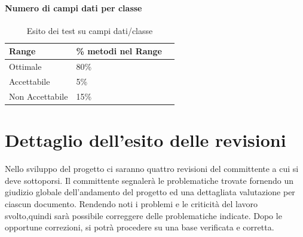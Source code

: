 \documentclass[12pt,a4paper]{article}
\begin{document}
\paragraph{Numero di campi dati per classe}
\begin{table}[H]
	\begin{center}
		\begin{tabular}{p{} p{} p{}}
			\toprule
			\textbf{Range}   & \textbf{\% metodi nel Range}	 \\ \midrule
			\midrule
			
			Ottimale & 80\% \\ \midrule
			Accettabile & 5\%  \\ \midrule
			Non Accettabile  & 15\%  \\ \midrule
			\bottomrule
		\end{tabular}
	\end{center}
	\caption{Esito dei test su campi dati/classe}
\end{table}


\section{Dettaglio dell'esito delle revisioni}
Nello sviluppo del progetto ci saranno quattro revisioni del committente a cui si deve sottoporsi. Il committente segnalerà le problematiche trovate fornendo un giudizio globale dell'andamento del progetto ed una dettagliata valutazione per ciascun documento. Rendendo noti i problemi e le criticità del lavoro svolto,quindi sarà possibile correggere delle problematiche indicate. Dopo le opportune correzioni, si potrà procedere su una base verificata e corretta.
\end{document}
